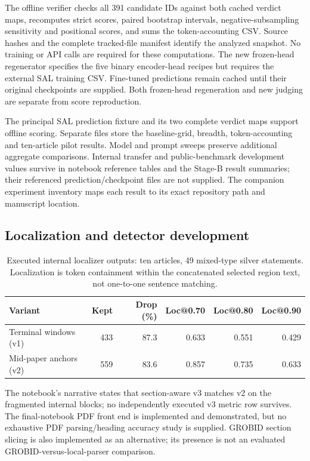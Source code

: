 The offline verifier checks all 391 candidate IDs against both cached verdict maps, recomputes
strict scores, paired bootstrap intervals, negative-subsampling sensitivity and positional
scores, and sums the token-accounting CSV. Source hashes and the complete tracked-file manifest
identify the analyzed snapshot. No training or API calls are required for these computations.
The new frozen-head regenerator specifies the five binary encoder-head recipes but requires the
external SAL training CSV. Fine-tuned predictions remain cached until their original checkpoints
are supplied. Both frozen-head regeneration and new judging are separate from score reproduction.

The principal SAL prediction fixture and its two complete verdict maps support offline scoring.
Separate files store the baseline-grid, breadth, token-accounting and ten-article pilot results.
Model and prompt sweeps preserve additional aggregate comparisons. Internal transfer and
public-benchmark development values survive in notebook reference tables and the Stage-B
result summaries; their referenced prediction/checkpoint files are not supplied. The companion
experiment inventory maps each result to its exact repository path and manuscript location.

\subsection{Localization and detector development}
\label{A:development}

\begin{table}[H]
\centering\small
\caption{Executed internal localizer outputs: ten articles, 49 mixed-type silver statements.
Localization is token containment within the concatenated selected region text, not one-to-one
sentence matching.}
\label{T:localizer-development}
\begin{tabular}{@{}lrrrrr@{}}
\toprule
Variant & Kept & Drop (\%) & Loc@0.70 & Loc@0.80 & Loc@0.90 \\
\midrule
Terminal windows (v1) & 433 & 87.3 & 0.633 & 0.551 & 0.429 \\
Mid-paper anchors (v2) & 559 & 83.6 & 0.857 & 0.735 & 0.633 \\
\bottomrule
\end{tabular}
\end{table}

The notebook's narrative states that section-aware v3 matches v2 on the fragmented internal
blocks; no independently executed v3 metric row survives. The final-notebook PDF front end is
implemented and demonstrated, but no exhaustive PDF parsing/heading accuracy study is supplied.
GROBID section slicing is also implemented as an alternative; its presence is not an evaluated
GROBID-versus-local-parser comparison.


